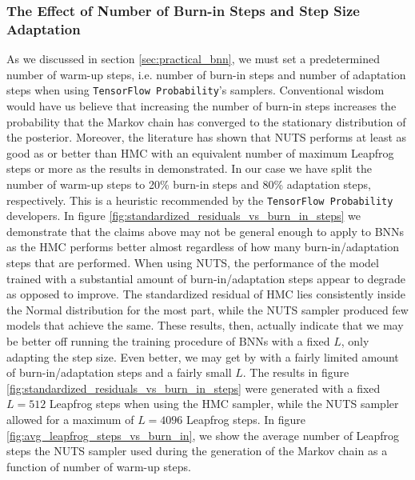 \subsubsection{The Effect of Number of Burn-in Steps and Step Size Adaptation}
As we discussed in section \ref{sec:practical_bnn}, we must set a predetermined number of warm-up steps, i.e. number of burn-in steps and number of adaptation steps when using {\tt TensorFlow Probability}'s samplers.
Conventional wisdom would have us believe that increasing the number of burn-in steps increases the probability that the Markov chain has converged
to the stationary distribution of the posterior. Moreover, the literature has shown that NUTS performs at least as good as or better than HMC with an equivalent number of maximum Leapfrog steps or more as the results in \cite{nuts} demonstrated. In our case we have split the number of warm-up steps to 20\% burn-in steps and 80\% adaptation steps, respectively. This is a heuristic recommended by the {\tt TensorFlow Probability} developers.
In figure \ref{fig:standardized_residuals_vs_burn_in_steps} we demonstrate that the claims above may not be general enough to apply to BNNs as the HMC performs better almost regardless of how many burn-in/adaptation steps that are performed. When using NUTS, the performance of the model trained with a substantial amount of burn-in/adaptation steps appear to degrade as opposed to improve. The standardized residual of HMC lies consistently inside the Normal distribution for the most part, while the NUTS sampler produced few models that achieve the same. These results, then, actually indicate that we may be better off running the training procedure of BNNs with a fixed $L$, only adapting the step size. Even better, we may get by with a fairly limited amount of burn-in/adaptation steps and a fairly small $L$. The results in figure \ref{fig:standardized_residuals_vs_burn_in_steps} were generated with a fixed $L = 512$ Leapfrog steps when using the HMC sampler, while the NUTS sampler allowed for a maximum of $L = 4096$ Leapfrog steps. In figure \ref{fig:avg_leapfrog_steps_vs_burn_in}, we show the average number of Leapfrog steps the NUTS sampler used during the generation of the Markov chain as a function of number of warm-up steps.


